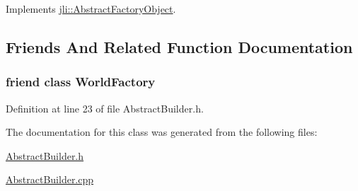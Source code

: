 Implements \hyperlink{classjli_1_1_abstract_factory_object_a9971edc5976c06cbfae1b0ae80722a43}{jli\+::\+Abstract\+Factory\+Object}.



\subsection{Friends And Related Function Documentation}
\hypertarget{classjli_1_1_abstract_builder_acb96ebb09abe8f2a37a915a842babfac}{
\subsubsection[{World\+Factory}]{\setlength{\rightskip}{0pt plus 5cm}friend class {\bf World\+Factory}\hspace{0.3cm}{\ttfamily [friend]}}}\label{classjli_1_1_abstract_builder_acb96ebb09abe8f2a37a915a842babfac}


Definition at line 23 of file Abstract\+Builder.\+h.



The documentation for this class was generated from the following files\+:\begin{DoxyCompactItemize}
\item 
\hyperlink{_abstract_builder_8h}{Abstract\+Builder.\+h}\item 
\hyperlink{_abstract_builder_8cpp}{Abstract\+Builder.\+cpp}\end{DoxyCompactItemize}
